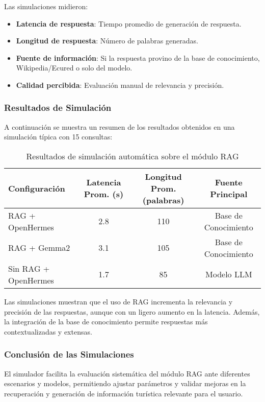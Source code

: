 \documentclass[runningheads]{llncs}
\begin{document}
Las simulaciones midieron:
\begin{itemize}
    \item \textbf{Latencia de respuesta}: Tiempo promedio de generación de respuesta.
    \item \textbf{Longitud de respuesta}: Número de palabras generadas.
    \item \textbf{Fuente de información}: Si la respuesta provino de la base de conocimiento, Wikipedia/Ecured o solo del modelo.
    \item \textbf{Calidad percibida}: Evaluación manual de relevancia y precisión.
\end{itemize}

\subsubsection{Resultados de Simulación}

A continuación se muestra un resumen de los resultados obtenidos en una simulación típica con 15 consultas:

\begin{table}[H]
\centering
\begin{tabular}{lccc}
\toprule
\textbf{Configuración} & \textbf{Latencia Prom. (s)} & \textbf{Longitud Prom. (palabras)} & \textbf{Fuente Principal} \\
\midrule
RAG + OpenHermes & 2.8 & 110 & Base de Conocimiento \\
RAG + Gemma2 & 3.1 & 105 & Base de Conocimiento \\
Sin RAG + OpenHermes & 1.7 & 85 & Modelo LLM \\
\bottomrule
\end{tabular}
\caption{Resultados de simulación automática sobre el módulo RAG}
\end{table}

Las simulaciones muestran que el uso de RAG incrementa la relevancia y precisión de las respuestas, aunque con un ligero aumento en la latencia. Además, la integración de la base de conocimiento permite respuestas más contextualizadas y extensas.

\subsubsection{Conclusión de las Simulaciones}

El simulador facilita la evaluación sistemática del módulo RAG ante diferentes escenarios y modelos, permitiendo ajustar parámetros y validar mejoras en la recuperación y generación de información turística relevante para el usuario.
\end{document}
